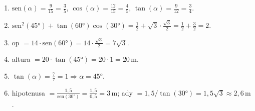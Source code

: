 \documentclass[11pt,a4paper]{article}
\begin{document}
\begin{tcolorbox}[propiedad, title=Soluciones]
\begin{enumerate}[nosep]
  \item $\mathrm{sen}(\alpha) = \frac{9}{15} = \frac{3}{5}$, $\cos(\alpha) = \frac{12}{15} = \frac{4}{5}$, $\tan(\alpha) = \frac{9}{12} = \frac{3}{4}$.
  \item $\mathrm{sen}^{2}(45°) + \tan(60°)\cos(30°) = \frac{1}{2} + \sqrt{3}\cdot\frac{\sqrt{3}}{2} = \frac{1}{2} + \frac{3}{2} = 2$.
  \item op $= 14 \cdot \mathrm{sen}(60°) = 14 \cdot \frac{\sqrt{3}}{2} = 7\sqrt{3}$.
  \item altura $= 20 \cdot \tan(45°) = 20 \cdot 1 = 20\,\text{m}$.
  \item $\tan(\alpha) = \frac{7}{7} = 1 \Rightarrow \alpha = 45°$.
  \item hipotenusa $= \frac{1{,}5}{\mathrm{sen}(30°)} = \frac{1{,}5}{0{,}5} = 3\,\text{m}$; \quad ady $= 1{,}5/\tan(30°) = 1{,}5\sqrt{3} \approx 2{,}6\,\text{m}$.
\end{enumerate}
\end{tcolorbox}
\end{document}
